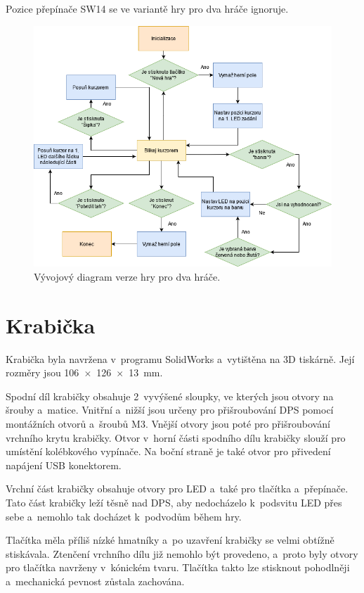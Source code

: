 Pozice přepínače SW14 se ve variantě hry pro dva hráče ignoruje. 

\begin{figure}[!h]
    \begin{center}
        \includegraphics[scale=0.6]{obrazky/vyvojovy_diagram_2_hraci.png}
    \end{center}
    \caption[Vývojový diagram verze hry pro dva hráče]{Vývojový diagram verze hry pro dva hráče.}
    \end{figure}

\chapter{Krabička}
Krabička byla navržena v~programu SolidWorks a~vytištěna na 3D tiskárně. Její rozměry jsou 106~$\times$~126~$\times$~13~mm. 

Spodní díl krabičky obsahuje 2~vyvýšené sloupky, ve kterých jsou otvory
na šrouby a~matice. Vnitřní a~nižší jsou určeny pro přišroubování DPS pomocí montážních otvorů a~šroubů M3. Vnější otvory jsou poté pro přišroubování 
vrchního krytu krabičky. Otvor v~horní části spodního dílu krabičky slouží pro umístění kolébkového vypínače. Na boční straně je také otvor
pro přivedení napájení USB konektorem.

Vrchní část krabičky obsahuje otvory pro LED a~také pro tlačítka a~přepínače. Tato část krabičky leží těsně nad DPS, aby nedocházelo k~podsvitu LED přes
sebe a~nemohlo tak docházet k~podvodům během hry. 

Tlačítka měla příliš nízké hmatníky a~po uzavření krabičky se velmi obtížně stiskávala. 
Ztenčení vrchního dílu již nemohlo být provedeno, a~proto byly otvory pro tlačítka navrženy v~kónickém tvaru. Tlačítka takto lze stisknout pohodlněji
a~mechanická pevnost zůstala zachována. 

